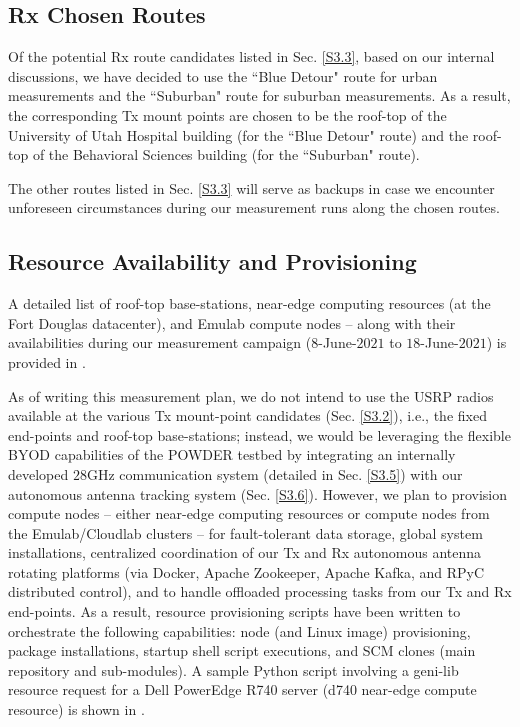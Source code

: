 \documentclass[12pt]{article}
\begin{document}
    \subsection{Rx Chosen Routes}\label{S3.4}
    Of the potential Rx route candidates listed in Sec. \ref{S3.3}, based on our internal discussions, we have decided to use the ``Blue Detour" route for urban measurements and the ``Suburban" route for suburban measurements. As a result, the corresponding Tx mount points are chosen to be the roof-top of the University of Utah Hospital building (for the ``Blue Detour" route) and the roof-top of the Behavioral Sciences building (for the ``Suburban" route).\newline
    
    \noindent The other routes listed in Sec. \ref{S3.3} will serve as backups in case we encounter unforeseen circumstances during our measurement runs along the chosen routes.
    
    \subsection{Resource Availability and Provisioning}
        A detailed list of roof-top base-stations, near-edge computing resources (at the Fort Douglas datacenter), and Emulab compute nodes -- along with their availabilities during our measurement campaign ($8$-June-$2021$ to $18$-June-$2021$) is provided in .\newline
        
        \noindent As of writing this measurement plan, we do not intend to use the USRP radios available at the various Tx mount-point candidates (Sec. \ref{S3.2}), i.e., the fixed end-points and roof-top base-stations; instead, we would be leveraging the flexible BYOD capabilities of the POWDER testbed by integrating an internally developed $28$GHz communication system (detailed in Sec. \ref{S3.5}) with our autonomous antenna tracking system (Sec. \ref{S3.6}). However, we plan to provision compute nodes -- either near-edge computing resources or compute nodes from the Emulab/Cloudlab clusters -- for fault-tolerant data storage, global system installations, centralized coordination of our Tx and Rx autonomous antenna rotating platforms (via Docker, Apache Zookeeper, Apache Kafka, and RPyC distributed control), and to handle offloaded processing tasks from our Tx and Rx end-points. As a result, resource provisioning scripts have been written to orchestrate the following capabilities: node (and Linux image) provisioning, package installations, startup shell script executions, and SCM clones (main repository and sub-modules). A sample Python script involving a geni-lib resource request for a Dell PowerEdge R740 server (d740 near-edge compute resource) is shown in .\newline
        
\end{document}
